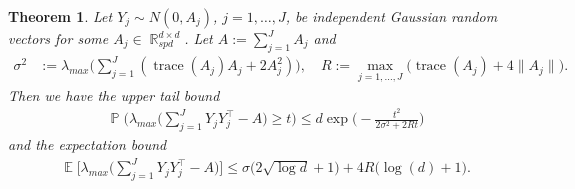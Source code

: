 \documentclass[preprint,aos]{imsart}
\numberwithin{equation}{section}
\newtheorem{theorem}[satz]{Theorem}
\theoremstyle{remark}
\DeclareMathOperator{\E}{{\mathbb E}}
\DeclareMathOperator{\R}{{\mathbb R}}
\DeclareMathOperator{\PP}{{\mathbb P}}
\DeclareMathOperator{\trace}{trace}
\providecommand{\norm}[1]{\lVert #1 \rVert}
\providecommand{\bnorm}[1]{{\Bigl\lVert #1 \Bigr\rVert}}
\renewcommand{\le}{\leqslant}
\renewcommand{\ge}{\geqslant}
\begin{document}
\begin{appendix}
\begin{theorem}\label{ThmBernstein}
Let $Y_j\sim N(0,A_j)$, $j=1,\ldots,J$, be independent Gaussian random vectors for some $A_j\in\R_{spd}^{d\times d}$. Let $A:=\sum_{j= 1}^J A_j$ and
\begin{align*}
\sigma^2 &:=\lambda_{max}\Big(\sum_{j= 1}^J(\trace(A_j) A_j+2A_j^2)\Big),\quad
 R:=\max_{j=1,\ldots,J}\big(\trace(A_j)+4\norm{A_j}\big).
\end{align*}
Then we have  the upper tail bound
\begin{align*}
&\PP\Big(\lambda_{max}\Big(\sum_{j= 1}^J Y_jY_j^\top-A\Big)\ge t\Big)\le d\exp\Big(-\frac{t^2}{2\sigma^2+2Rt}\Big)
\end{align*}
and the expectation bound
\begin{align*}
&\E\Big[\lambda_{max}\Big(\sum_{j= 1}^J Y_jY_j^\top-A\Big)\Big]\le \sigma\big(2\sqrt{\log d}+1\big)+4R\big(\log(d)+1\big).
\end{align*}
\end{theorem}


\end{appendix}
\end{document}
